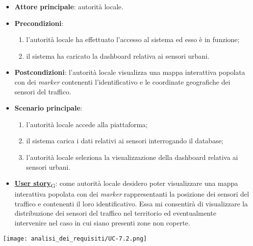 \begin{itemize}
	\item \textbf{Attore principale}: autorità locale.
	\item \textbf{Precondizioni}:
	      \begin{enumerate}
		      \item l'autorità locale ha effettuato l'accesso al sistema ed esso è in funzione;
		      \item il sistema ha caricato la dashboard relativa ai sensori urbani.
	      \end{enumerate}
	\item \textbf{Postcondizioni}: l'autorità locale visualizza una mappa interattiva popolata con dei \textit{marker} contenenti l'identificativo e le coordinate geografiche dei sensori del traffico.
	\item \textbf{Scenario principale}:
	      \begin{enumerate}
		      \item l'autorità locale accede alla piattaforma;
		      \item il sistema carica i dati relativi ai sensori interrogando il database;
		      \item l'autorità locale seleziona la visualizzazione della dashboard relativa ai sensori urbani.
	      \end{enumerate}
	\item \href{https://7last.github.io/docs/rtb/documentazione-interna/glossario\#user-story}{\textbf{User story}\textsubscript{G}}:
	      come autorità locale desidero poter visualizzare una mappa interattiva popolata con dei \textit{marker} rappresentanti la posizione dei sensori del traffico
	      e contenenti il loro identificativo. Essa mi consentirà di visualizzare la distribuzione dei sensori del traffico nel territorio ed eventualmente intervenire nel caso in cui siano presenti zone non coperte.
\end{itemize}
\begin{center}
	\texttt{[image: analisi\_dei\_requisiti/UC-7.2.png]}
\end{center}


